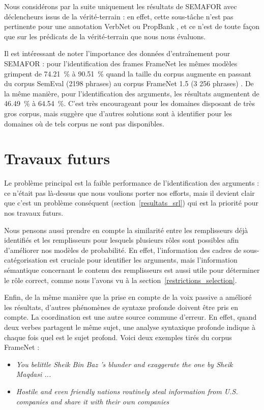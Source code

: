 Nous considérons par la suite uniquement les résultats de SEMAFOR avec
déclencheurs issus de la vérité-terrain : en effet, cette sous-tâche n'est pas
pertinente pour une annotation VerbNet ou PropBank
\citep[section~4]{das2014frame}, et ce n'est de toute façon que sur les
prédicats de la vérité-terrain que nous nous évaluons.

Il est intéressant de noter l'importance des données d'entraînement pour
SEMAFOR : pour l'identification des frames FrameNet les mêmes modèles grimpent
de 74.21~\% à 90.51~\% quand la taille du corpus augmente en passant du corpus
SemEval (2198 phrases) au corpus FrameNet 1.5 (3 256 phrases)
\citep[section~4]{das2014frame}. De la même manière, pour l'identification des
arguments, les résultats augmentent de 46.49~\% à 64.54~\%. C'est très
encourageant pour les domaines disposant de très gros corpus, mais suggère que
d'autres solutions sont à identifier pour les domaines où de tels corpus ne
sont pas disponibles.

\section{Travaux futurs}

Le problème principal est la faible performance de l'identification des
arguments : ce n'était pas là-dessus que nous voulions porter nos efforts, mais
il devient clair que c'est un problème conséquent (section~\ref{resultats_srl})
qui est la priorité pour nos travaux futurs.

Nous pensons aussi prendre en compte la similarité entre les remplisseurs déjà
identifiés et les remplisseurs pour lesquels plusieurs rôles sont possibles
afin d'améliorer nos modèles de probabilité. En effet, l'information des cadres
de sous-catégorisation est cruciale pour identifier les arguments, mais
l'information sémantique concernant le contenu des remplisseurs est aussi utile
pour déterminer le rôle correct, comme nous l'avons vu à la
section~\ref{restrictions_selection}.

Enfin, de la même manière que la prise en compte de la voix passive a amélioré
les résultats, d'autres phénomènes de syntaxe profonde doivent être pris en
compte. La coordination est une autre source commune d'erreur. En effet, quand
deux verbes partagent le même sujet, une analyse syntaxique profonde indique à
chaque fois quel est le sujet profond. Voici deux exemples tirés du corpus
FrameNet :

\begin{itemize}
    \item \textit{You belittle Sheik Bin Baz 's blunder and
        exaggerate the one by Sheik Maqdasi ...}
    \item \textit{Hostile and even friendly nations routinely steal information
        from U.S. companies and share it with their own companies}
\end{itemize}

